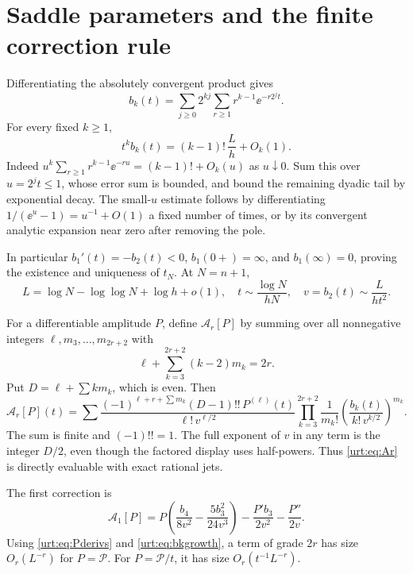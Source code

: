 \documentclass[11pt,letterpaper]{article}
\theoremstyle{remark}\newtheorem{remark}[theorem]{Remark}
\newcommand{\Pc}{\mathcal P}\newcommand{\Bc}{\mathcal B}\newcommand{\dd}{\mathrm d}
\begin{document}
\section{Saddle parameters and the finite correction rule}\label{urt:sec:saddle}
Differentiating the absolutely convergent product gives
\begin{equation}\label{urt:eq:bkexplicit}
 b_k(t)=\sum_{j\ge0}2^{kj}\sum_{r\ge1}r^{k-1}\ee^{-r2^jt}.
\end{equation}
For every fixed $k\ge1$,
\begin{equation}\label{urt:eq:bkgrowth}
 t^kb_k(t)=(k-1)!\,\frac{L}{h}+O_k(1).
\end{equation}
Indeed $u^k\sum_{r\ge1}r^{k-1}\ee^{-ru}=(k-1)!+O_k(u)$ as $u\downarrow0$. Sum this over $u=2^jt\le1$, whose error sum is bounded, and bound the remaining dyadic tail by exponential decay. The small-$u$ estimate follows by differentiating $1/(\ee^u-1)=u^{-1}+O(1)$ a fixed number of times, or by its convergent analytic expansion near zero after removing the pole.

In particular $b_1'(t)=-b_2(t)<0$, $b_1(0+)=\infty$, and $b_1(\infty)=0$, proving the existence and uniqueness of $t_N$. At $N=n+1$,
\begin{equation}\label{urt:eq:saddleL}
 L=\log N-\log\log N+\log h+o(1),\quad
 t\sim\frac{\log N}{hN},\quad v=b_2(t)\sim\frac{L}{ht^2}.
\end{equation}

For a differentiable amplitude $P$, define $\mathcal A_r[P]$ by summing over all nonnegative integers $\ell,m_3,\ldots,m_{2r+2}$ with
\[
 \ell+\sum_{k=3}^{2r+2}(k-2)m_k=2r.
\]
Put $D=\ell+\sum k m_k$, which is even. Then
\begin{equation}\label{urt:eq:Ar}
 \mathcal A_r[P](t)=
 \sum \frac{(-1)^{\ell+r+\sum m_k}(D-1)!!\,P^{(\ell)}(t)}{\ell!\,v^{\ell/2}}
 \prod_{k=3}^{2r+2}\frac1{m_k!}
 \left(\frac{b_k(t)}{k!\,v^{k/2}}\right)^{m_k}.
\end{equation}
The sum is finite and $(-1)!!=1$. The full exponent of $v$ in any term is the integer $D/2$, even though the factored display uses half-powers. Thus \eqref{urt:eq:Ar} is directly evaluable with exact rational jets.

The first correction is
\begin{equation}\label{urt:eq:A1}
 \mathcal A_1[P]=P\left(\frac{b_4}{8v^2}-\frac{5b_3^2}{24v^3}\right)
                -\frac{P'b_3}{2v^2}-\frac{P''}{2v}.
\end{equation}
Using \eqref{urt:eq:Pderivs} and \eqref{urt:eq:bkgrowth}, a term of grade $2r$ has size $O_r(L^{-r})$ for $P=\Pc$. For $P=\Pc/t$, it has size $O_r(t^{-1}L^{-r})$.
\end{document}
